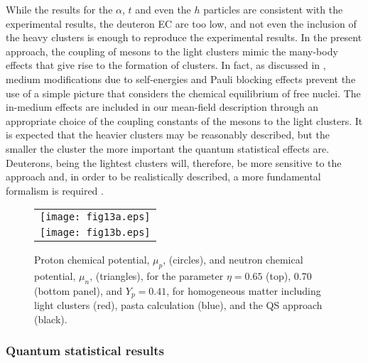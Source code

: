 \documentclass[aps,prc,nofootinbib,twocolumn,showpacs]{revtex4-1}
\begin{document}
 While the
results for the $\alpha$,  $t$ and even the $h$ particles are consistent with the
experimental results, the deuteron EC 
are too low, and not even the inclusion of the heavy clusters is enough to reproduce
the experimental results.  In the present approach, the
coupling of mesons to the light clusters mimic the many-body effects
that give rise to the formation of clusters. In fact, as discussed in
\cite{roepke15}, medium modifications due to self-energies and Pauli
blocking effects prevent the use of a simple picture that considers  the chemical
equilibrium of free nuclei.  The in-medium effects are  included in our mean-field
description through  an appropriate choice of the coupling
constants of the mesons to the light clusters. It is expected that the
heavier clusters may be reasonably described, but the smaller the
cluster the more important the quantum statistical effects are. Deuterons,
being the lightest clusters will, therefore, be more sensitive to the
approach and, in order to be realistically described, a more
fundamental formalism is required \cite{roepke09,typel10,roepke11,roepke15}.

\begin{figure}[thb]
\begin{tabular}{c}
     \texttt{[image: fig13a.eps]} \\ 
     \texttt{[image: fig13b.eps]}\\
\end{tabular}
    \caption{Proton chemical potential, $\mu_p$, (circles), and neutron chemical potential, $\mu_n$, (triangles), for the parameter $\eta=0.65$ (top), 0.70 (bottom panel), and $Y_p=0.41$, for homogeneous matter including light clusters (red), pasta calculation (blue), and the QS approach (black). }
\label{fig13}
\end{figure}



\subsubsection{Quantum statistical results}
\end{document}
